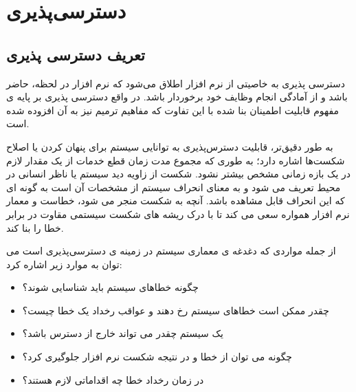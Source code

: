 \chapter{دسترسی‌پذیری}
\section{تعریف دسترسی پذیری}
دسترسی پذیری به خاصیتی از نرم افزار اطلاق می‌شود که نرم افزار در لحظه، حاضر باشد و از آمادگی انجام وظایف خود برخوردار باشد.
در واقع دسترسی پذیری بر پایه ی مفهوم قابلیت اطمینان بنا شده با این تفاوت که مفاهیم ترمیم  نیز به آن افزوده شده است.

به طور دقیق‌تر، قابلیت دسترس‌پذیری به توانایی سیستم برای پنهان کردن یا اصلاح شکست‌ها اشاره دارد؛‌ به طوری که مجموع مدت زمان قطع خدمات از یک مقدار لازم در یک بازه زمانی مشخص بیشتر نشود. شکست از زاویه دید سیستم یا ناظر انسانی در محیط تعریف می شود و به معنای انحراف سیستم از مشخصات آن است به گونه ای که این انحراف قابل مشاهده باشد. آنچه به شکست منجر می شود، خطاست و معمار نرم افزار همواره سعی می کند تا با درک ریشه های شکست سیستمی مقاوت در برابر خطا را بنا کند.

از جمله مواردی که دغدغه ی معماری سیستم در زمینه ی دسترسی‌پذیری است می توان به موارد زیر اشاره کرد:
\begin{itemize}
\item
چگونه خطا‌های سیستم باید شناسایی شوند؟
\item
چقدر ممکن است خطا‌های سیستم رخ دهند و عواقب رخداد یک خطا چیست؟
\item
یک سیستم چقدر می تواند خارج از دسترس باشد؟
\item
چگونه می توان از خطا و در نتیجه شکست نرم افزار جلوگیری کرد؟
\item
در زمان رخداد خطا چه اقداماتی لازم هستند؟
\end{itemize}


